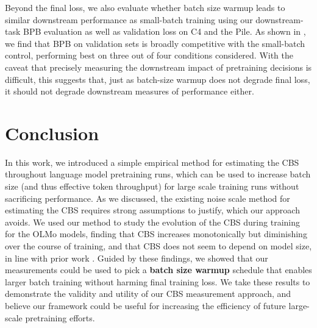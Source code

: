\documentclass{article}
\newcommand{\hanna}[1]{\textcolor{purple}{[Hanna]: #1}}
\begin{document}

Beyond the final loss, we also evaluate whether batch size warmup leads to similar downstream performance as small-batch training using our downstream-task BPB evaluation as well as validation loss on C4 and the Pile.
As shown in , we find that BPB on validation sets is broadly competitive with the small-batch control, performing best on three out of four conditions considered.
With the caveat that precisely measuring the downstream impact of pretraining decisions is difficult, this suggests that, just as batch-size warmup does not degrade final loss, it should not degrade downstream measures of performance either.

\section{Conclusion}

In this work, we introduced a simple empirical method for estimating the CBS throughout language model pretraining runs, which can be used to increase batch size (and thus effective token throughput) for large scale training runs without sacrificing performance.
As we discussed, the existing noise scale method \citep{mccandlish2018empirical} for estimating the CBS requires strong assumptions to justify, which our approach avoids.
We used our method to study the evolution of the CBS during training for the OLMo models, finding that CBS increases monotonically but diminishing over the course of training, and that CBS does not seem to depend on model size, in line with prior work \citep{zhang2024cbs}.
Guided by these findings, we showed that our measurements could be used to pick a \textbf{batch size warmup} schedule that enables larger batch training without harming final training loss.
We take these results to demonstrate the validity and utility of our CBS measurement approach, and believe our framework could be useful for increasing the efficiency of future large-scale pretraining efforts.
\end{document}
